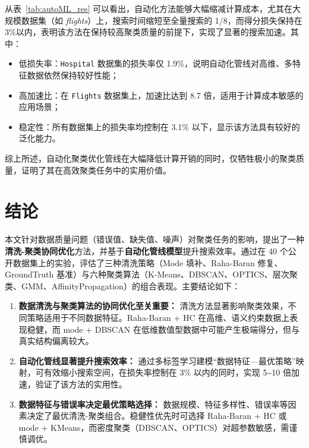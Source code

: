 \documentclass[10pt]{article} %
\numberwithin{equation}{section}
\begin{document}
\noindent
从表~\ref{tab:autoML_res} 可以看出，自动化方法能够大幅缩减计算成本，尤其在大规模数据集（如 \textit{flights}）上，搜索时间缩短至全量搜索的 1/8，而得分损失保持在 3\%以内，表明该方法在保持较高聚类质量的前提下，实现了显著的搜索加速。其中：
\begin{itemize}
    \item 低损失率：\texttt{Hospital} 数据集的损失率仅 1.9\%，说明自动化管线对高维、多特征数据依然保持较好性能；
    \item 高加速比：在 \texttt{Flights} 数据集上，加速比达到 8.7 倍，适用于计算成本敏感的应用场景；
    \item 稳定性：所有数据集上的损失率均控制在 3.1\% 以下，显示该方法具有较好的泛化能力。
\end{itemize}

\noindent
综上所述，自动化聚类优化管线在大幅降低计算开销的同时，仅牺牲极小的聚类质量，证明了其在高效聚类任务中的实用价值。 


\section{结论}
\label{sec:conclusion}

本文针对数据质量问题（错误值、缺失值、噪声）对聚类任务的影响，提出了一种\textbf{清洗-聚类协同优化}方法，并基于\textbf{自动化管线模型}提升搜索效率。通过在 40 个公开数据集上的实验，评估了三种清洗策略（Mode 填补、Raha-Baran 修复、GroundTruth 基准）与六种聚类算法（K-Means、DBSCAN、OPTICS、层次聚类、GMM、AffinityPropagation）的组合表现。主要结论如下：

\begin{enumerate}
    \item \textbf{数据清洗与聚类算法的协同优化至关重要：}
    清洗方法显著影响聚类效果，不同策略适用于不同数据特征。Raha-Baran + HC 在高维、语义约束数据上表现稳健，而 mode + DBSCAN 在低维数值型数据中可能产生极端得分，但与真实结构偏离较大。

    \item \textbf{自动化管线显著提升搜索效率：}  
    通过多标签学习建模“数据特征—最优策略”映射，可有效缩小搜索空间，在损失率控制在 3\% 以内的同时，实现 5\textasciitilde10 倍加速，验证了该方法的实用性。

    \item \textbf{数据特征与错误率决定最优策略选择：}  
    数据规模、特征多样性、错误率等因素决定了最优清洗-聚类组合。稳健性优先时可选择 Raha-Baran + HC 或 mode + KMeans，而密度聚类（DBSCAN、OPTICS）对超参数敏感，需谨慎调优。
\end{enumerate}
\end{document}
